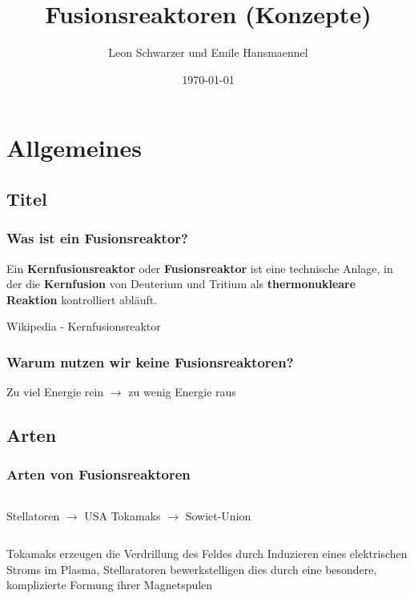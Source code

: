 \documentclass[aspectratio=169]{beamer}
\title{Fusionsreaktoren (Konzepte)}
\subtitle{}
\author{Leon Schwarzer und Emile Hansmaennel}
\institute{Theodor-Fliedner-Gymnasium}
\date{\today}
\begin{document}
  \begin{frame}
    \titlepage
  \end{frame}

  \section{Allgemeines}
    \subsection{Titel}

      \begin{frame}
        \frametitle{Was ist ein Fusionsreaktor?}
        Ein \textbf{Kernfusionsreaktor} oder \textbf{Fusionsreaktor} ist eine
        technische Anlage, in der die \textbf{Kernfusion} von Deuterium und Tritium als
        \textbf{thermonukleare Reaktion} kontrolliert abläuft.
        \par
        \raggedleft
        Wikipedia - Kernfusionsreaktor
      \end{frame}

      \begin{frame}
        \frametitle{Warum nutzen wir keine Fusionsreaktoren?}
        \center
        Zu viel Energie rein \( \rightarrow \) zu wenig Energie raus
      \end{frame}

    \subsection{Arten}

      \begin{frame}
        \frametitle{Arten von Fusionsreaktoren}
        \begin{columns}
          \center
          Stellatoren \( \rightarrow \) USA
          \bigskip
          \center
          Tokamaks \( \rightarrow \) Sowiet-Union
        \end{columns}

        \bigskip
        \bigskip
        \bigskip
        

        Tokamaks erzeugen die Verdrillung des Feldes durch Induzieren eines
        elektrischen Stroms im Plasma, Stellaratoren bewerkstelligen dies durch
        eine besondere, komplizierte Formung ihrer Magnetspulen

      \end{frame}
\end{document}
